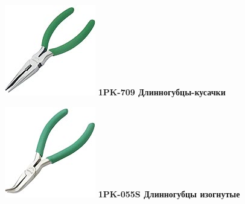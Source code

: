 \documentclass{magazine}
\begin{document}
{\noindent\includegraphics[width=\columnwidth]{fig/00/pros/1PK-709.jpg}
\textbf{1PK-709 Длинногубцы-кусачки}

\noindent\includegraphics[width=\columnwidth]{fig/00/pros/1PK-055S.jpg}
\textbf{1PK-055S Длинногубцы изогнутые}

}
\end{document}
